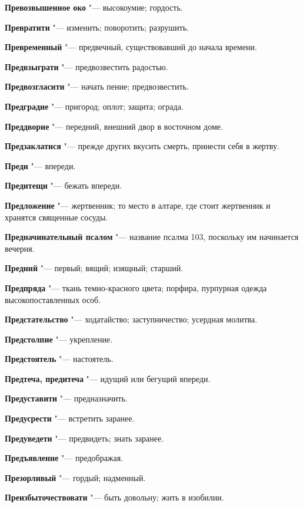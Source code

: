 \begin{mymulticols}
\noindent\textbf{Превозвышенное око} "--- высокоумие; гордость. 

\noindent\textbf{Превратити} "--- изменить; поворотить; разрушить. 

\noindent\textbf{Превременный} "--- предвечный, существовавший до начала времени. 

\noindent\textbf{Предвзыграти} "--- предвозвестить радостью. 

\noindent\textbf{Предвозгласити} "--- начать пение; предвозвестить. 

\noindent\textbf{Предградие} "--- пригород; оплот; защита; ограда. 

\noindent\textbf{Преддворие} "--- передний, внешний двор в восточном доме. 

\noindent\textbf{Предзаклатися} "--- прежде других вкусить смерть, принести себя в жертву. 

\noindent\textbf{Преди} "--- впереди. 

\noindent\textbf{Предитещи} "--- бежать впереди. 

\noindent\textbf{Предложение} "--- жертвенник; то место в алтаре, где стоит жертвенник и хранятся священные сосуды. 

\noindent\textbf{Предначинательный псалом} "--- название псалма 103, поскольку им начинается вечерня. 

\noindent\textbf{Предний} "--- первый; вящий; изящный; старший. 

\noindent\textbf{Предпряда} "--- ткань темно-красного цвета; порфира, пурпурная одежда высокопоставленных особ. 

\noindent\textbf{Предстательство} "--- ходатайство; заступничество; усердная молитва. 

\noindent\textbf{Предстолпие} "--- укрепление. 

\noindent\textbf{Предстоятель} "--- настоятель. 

\noindent\textbf{Предтеча, предитеча} "--- идущий или бегущий впереди. 

\noindent\textbf{Предуставити} "--- предназначить. 

\noindent\textbf{Предусрести} "--- встретить заранее. 

\noindent\textbf{Предуведети} "--- предвидеть; знать заранее. 

\noindent\textbf{Предъявленне} "--- предображая. 

\noindent\textbf{Презорливый} "--- гордый; надменный. 

\noindent\textbf{Преизбыточествовати} "--- быть довольну; жить в изобилии. 


\end{mymulticols}
